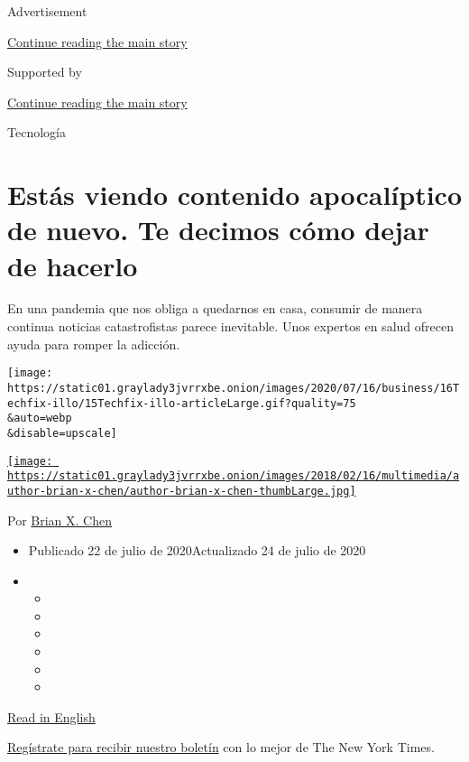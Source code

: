 Advertisement

\protect\hyperlink{after-top}{Continue reading the main story}

Supported by

\protect\hyperlink{after-sponsor}{Continue reading the main story}

Tecnología

\hypertarget{estuxe1s-viendo-contenido-apocaluxedptico-de-nuevo-te-decimos-cuxf3mo-dejar-de-hacerlo}{%
\section{Estás viendo contenido apocalíptico de nuevo. Te decimos cómo
dejar de
hacerlo}\label{estuxe1s-viendo-contenido-apocaluxedptico-de-nuevo-te-decimos-cuxf3mo-dejar-de-hacerlo}}

En una pandemia que nos obliga a quedarnos en casa, consumir de manera
continua noticias catastrofistas parece inevitable. Unos expertos en
salud ofrecen ayuda para romper la adicción.

\texttt{[image: https://static01.graylady3jvrrxbe.onion/images/2020/07/16/business/16Techfix-illo/15Techfix-illo-articleLarge.gif?quality=75\\\&auto=webp\\\&disable=upscale]}

\href{https://www.nytimes3xbfgragh.onion/by/brian-x-chen}{\texttt{[image: https://static01.graylady3jvrrxbe.onion/images/2018/02/16/multimedia/author-brian-x-chen/author-brian-x-chen-thumbLarge.jpg]}}

Por \href{https://www.nytimes3xbfgragh.onion/by/brian-x-chen}{Brian X.
Chen}

\begin{itemize}
\item
  Publicado 22 de julio de 2020Actualizado 24 de julio de 2020
\item
  \begin{itemize}
  \item
  \item
  \item
  \item
  \item
  \item
  \end{itemize}
\end{itemize}

\href{https://www.nytimes3xbfgragh.onion/2020/07/15/technology/personaltech/youre-doomscrolling-again-heres-how-to-snap-out-of-it.html}{Read
in English}

\href{https://www.nytimes3xbfgragh.onion/newsletters/el-times}{Regístrate
para recibir nuestro boletín} con lo mejor de The New York Times.

